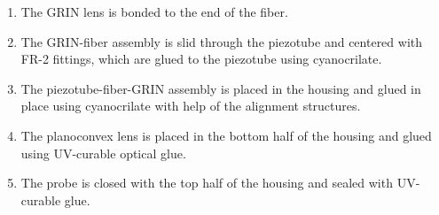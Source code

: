 \begin{enumerate}
\item The GRIN lens is bonded to the end of the fiber.
\item The GRIN-fiber assembly is slid through the piezotube and centered with FR-2 fittings, which are glued to the piezotube using cyanocrilate.
\item The piezotube-fiber-GRIN assembly is placed in the housing and glued in place using cyanocrilate with help of the alignment structures.
\item The planoconvex lens is placed in the bottom half of the housing and glued using UV-curable optical glue.
\item The probe is closed with the top half of the housing and sealed with UV-curable glue.
\end{enumerate}

